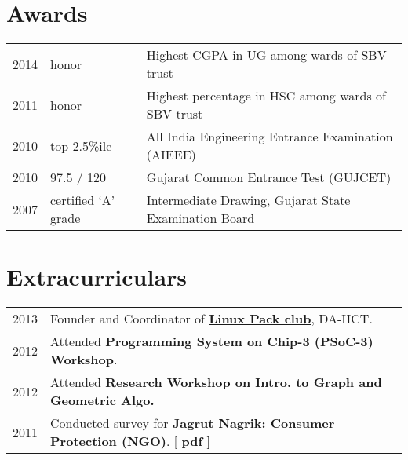 \documentclass[]{deedy}
\begin{document}
\begin{minipage}[t]{0.66\textwidth}
\section{Awards}
\begin{tabular}{rll}
2014 & honor & Highest CGPA in UG among wards of SBV trust\\
2011 & honor & Highest percentage in HSC among wards of SBV trust\\
2010 & top 2.5\%ile & All India Engineering Entrance Examination (AIEEE)\\
2010 & 97.5 / 120 & Gujarat Common Entrance Test (GUJCET)\\
2007 & certified `A' grade & Intermediate Drawing, Gujarat State Examination Board\\
\end{tabular}

\section{Extracurriculars}
\vspace{\topsep} %
\begin{tabular}{ll}
2013 & Founder and Coordinator of  \href{http://lpdaiict.wordpress.com/}{\textbf{Linux Pack club}}, DA-IICT.\\
2012 & Attended \textbf{Programming System on Chip-3 (PSoC-3) Workshop}.\\
2012 & Attended \textbf{Research Workshop on Intro. to Graph and Geometric Algo.}\\
2011 & Conducted survey for \textbf{Jagrut Nagrik: Consumer Protection (NGO)}. [ \href{https://dl.dropboxusercontent.com/u/9020146/resources/reports/rural_internship.pdf}{\textbf{pdf}} ]\\
\end{tabular}

\end{minipage}
\end{document}
